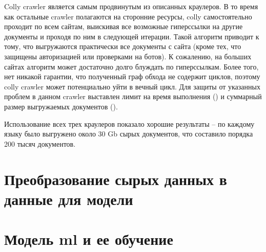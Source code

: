 Colly \gls{crawler} \cite{cite:colly} является самым продвинутым из описанных краулеров.
В то время как остальные \gls{crawler} полагаются на сторонние ресурсы, colly самостоятельно проходит по всем сайтам, выискивая все возможные гиперссылки на другие документы и проходя по ним в следующей итерации.
Такой алгоритм приводит к тому, что выгружаются практически все документы с сайта (кроме тех, что защищены авторизацией или проверками на ботов).
К сожалению, на больших сайтах алгоритм может достаточно долго блуждать по гиперссылкам.
Более того, нет никакой гарантии, что полученный граф обхода не содержит циклов, поэтому colly crawler может потенциально уйти в вечный цикл.
Для защиты от указанных проблем в данном \gls{crawler} выставлен лимит на время выполнения (\collyTimeLimit) и суммарный размер выгружаемых документов (\collySizeLimit).

Использование всех трех краулеров показало хорошие результаты -- по каждому языку было выгружено около 30 Gb сырых документов, что составило порядка 200 тысяч документов.

\section{Преобразование сырых данных в данные для модели}
\label{sec:preprocessing}

\section{Модель \acrshort{ml} и ее обучение}
\label{sec:training}
